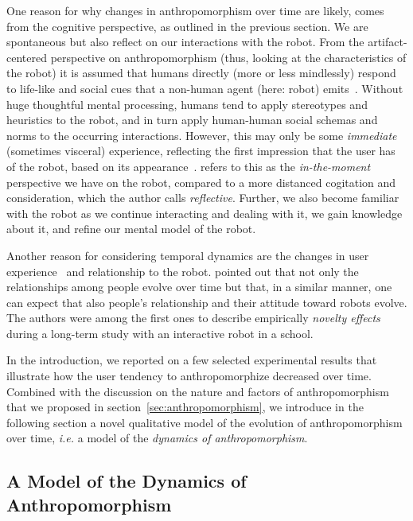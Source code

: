 \documentclass{frontiersSCNS} %
\newcommand{\ie}{\textit{i.e.}\xspace}
\begin{document}
One reason for why changes in anthropomorphism over time are likely, comes from
the cognitive perspective, as outlined in the previous section. We are
spontaneous but also reflect on our interactions with the robot.  From the
artifact-centered perspective on anthropomorphism (thus, looking at the
characteristics of the robot) it is assumed that humans directly (more or less
mindlessly) respond to life-like and social cues that a non-human agent (here:
robot) emits~\citep{reeves_media_1996,nass_machines_2000}. Without huge
thoughtful mental processing, humans tend to apply stereotypes and heuristics to
the robot, and in turn apply human-human social schemas and norms to the
occurring interactions. However, this may only be some \textit{immediate}
(sometimes visceral) experience, reflecting the first impression that the user
has of the robot, based on its appearance~\citep{norman_emotional_2003}.
\cite{takayama_perspectives_2012} refers to this as the \textit{in-the-moment}
perspective we have on the robot, compared to a more distanced cogitation and
consideration, which the author calls \textit{reflective}.  Further, we also
become familiar with the robot as we continue interacting and dealing with it,
we gain knowledge about it, and refine our mental model of the robot.

Another reason for considering temporal dynamics are the changes in user
experience~\citep{karapanos_user_2009} and relationship to the robot.
\cite{kanda_interactive_2004} pointed out that not only the relationships among
people evolve over time but that, in a similar manner, one can expect that also
people's relationship and their attitude toward robots evolve. The authors were
among the first ones to describe empirically \textit{novelty effects} during a
long-term study with an interactive robot in a school.


In the introduction, we reported on a few selected experimental results that
illustrate how the user tendency to anthropomorphize decreased over time.
Combined with the discussion on the nature and factors of
anthropomorphism that we proposed in section~\ref{sec:anthropomorphism}, we
introduce in the following section a novel qualitative model of the evolution of
anthropomorphism over time, \ie a model of the \emph{dynamics of
anthropomorphism}.


\subsection{A Model of the Dynamics of Anthropomorphism}
\label{sec:dynamics-model}
\end{document}
